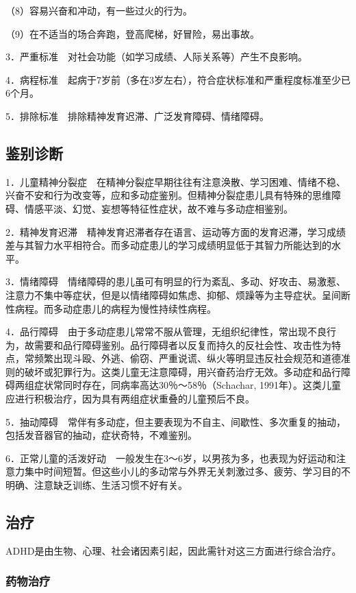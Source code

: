 （8）容易兴奋和冲动，有一些过火的行为。

（9）在不适当的场合奔跑，登高爬梯，好冒险，易出事故。

3．严重标准　对社会功能（如学习成绩、人际关系等）产生不良影响。

4．病程标准　起病于7岁前（多在3岁左右），符合症状标准和严重程度标准至少已6个月。

5．排除标准　排除精神发育迟滞、广泛发育障碍、情绪障碍。

\subsection{鉴别诊断}

1．儿童精神分裂症　在精神分裂症早期往往有注意涣散、学习困难、情绪不稳、兴奋不安和行为改变等，应和多动症鉴别。但精神分裂症患儿具有特殊的思维障碍、情感平淡、幻觉、妄想等特征性症状，故不难与多动症相鉴别。

2．精神发育迟滞　精神发育迟滞者存在语言、运动等方面的发育迟滞，学习成绩差与其智力水平相符合。而多动症患儿的学习成绩明显低于其智力所能达到的水平。

3．情绪障碍　情绪障碍的患儿虽可有明显的行为紊乱、多动、好攻击、易激惹、注意力不集中等症状，但是以情绪障碍如焦虑、抑郁、烦躁等为主导症状。呈间断性病程。而多动症患儿的病程为慢性持续性病程。

4．品行障碍　由于多动症患儿常常不服从管理，无组织纪律性，常出现不良行为，故需要和品行障碍鉴别。品行障碍者以反复而持久的反社会性、攻击性为特点，常频繁出现斗殴、外逃、偷窃、严重说谎、纵火等明显违反社会规范和道德准则的破坏或犯罪行为。这类儿童无注意障碍，用兴奋药治疗无效。多动症和品行障碍两组症状常同时存在，同病率高达30％～58％（Schachar,
1991年）。这类儿童应进行积极治疗，因为具有两组症状重叠的儿童预后不良。

5．抽动障碍　常伴有多动症，但主要表现为不自主、间歇性、多次重复的抽动，包括发音器官的抽动，症状奇特，不难鉴别。

6．正常儿童的活泼好动　一般发生在3～6岁，以男孩为多，也表现为好运动和注意力集中时间短暂。但这些小儿的多动常与外界无关刺激过多、疲劳、学习目的不明确、注意缺乏训练、生活习惯不好有关。

\subsection{治疗}

ADHD是由生物、心理、社会诸因素引起，因此需针对这三方面进行综合治疗。

\subsubsection{药物治疗}


